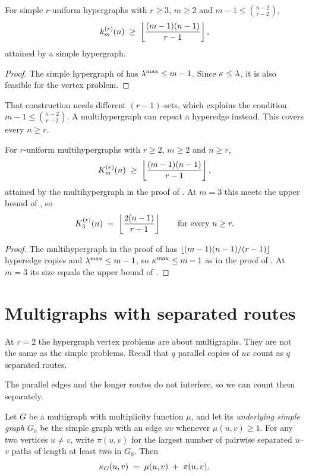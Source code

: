 \begin{proposition}\label{prop:hyper-vertex-lower}
For simple $r$-uniform hypergraphs with $r \ge 3$, $m \ge 2$ and $m - 1 \le \binom{n-2}{r-2}$,
\[
    k_m^{(r)}(n) \;\ge\; \left\lfloor \frac{(m-1)(n-1)}{r-1} \right\rfloor,
\]
attained by a simple hypergraph.
\end{proposition}

\begin{proof}
The simple hypergraph of  has $\lambda^{\max}\le m-1$.
Since $\kappa \le \lambda$, it is also feasible for the vertex problem.
\end{proof}

That construction needs different $(r-1)$-sets, which explains the condition $m-1\le\binom{n-2}{r-2}$.
A multihypergraph can repeat a hyperedge instead. This covers every $n \ge r$.

\begin{proposition}\label{prop:hyper-vertex-lower-multi}
For $r$-uniform multihypergraphs with $r \ge 2$, $m \ge 2$ and $n \ge r$,
\[
    K_m^{(r)}(n) \;\ge\; \left\lfloor \frac{(m-1)(n-1)}{r-1} \right\rfloor,
\]
attained by the multihypergraph in the proof of .
At $m = 3$ this meets the upper bound of , so
\[
    K_3^{(r)}(n) \;=\; \left\lfloor \frac{2(n-1)}{r-1} \right\rfloor
    \qquad\text{for every } n \ge r.
\]
\end{proposition}

\begin{proof}
The multihypergraph in the proof of  has $\left\lfloor (m-1)(n-1)/(r-1) \right\rfloor$ hyperedge copies and $\lambda^{\max}\le m-1$, so $\kappa^{\max}\le m-1$ as in the proof of .
At $m = 3$ its size equals the upper bound of .
\end{proof}

\section{Multigraphs with separated routes}\label{sec:multi-vertex}

At $r = 2$ the hypergraph vertex problems are about multigraphs.
They are not the same as the simple problems.
Recall that $q$ parallel copies of $uv$ count as $q$ separated routes.

The parallel edges and the longer routes do not interfere, so we can count them separately.

\begin{lemma}\label{lem:multi-vertex-split}
Let $G$ be a multigraph with multiplicity function $\mu$, and let its \emph{underlying simple graph} $G_0$ be the simple graph with an edge $uv$ whenever $\mu(u,v)\ge1$. For any two vertices $u \ne v$, write $\pi(u,v)$ for the largest number of pairwise separated $u$--$v$ paths of length at least two in $G_0$. Then
\[
    \kappa_G(u,v) \;=\; \mu(u,v) \;+\; \pi(u,v).
\]
\end{lemma}

